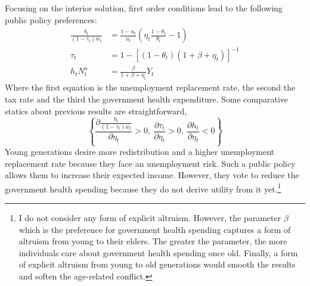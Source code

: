 Focusing on the interior solution, first order conditions lead to the following public policy preferences:
	\begin{align}
		\frac{b_t}{(1-\tau_t)w_t} &= \frac{1-u_t}{u_t} \left(\eta_t\frac{1-\theta_t}{\theta_t}- 1\right)
		\label{eq:inverse_replacement_rate}\\
		\tau_t &= 1 - \left[\left(1-\theta_t\right)\left(1+\beta+\eta_t\right)\right]^{-1}
		\label{eq:tax_rate} \\
		h_t N^o_t &= \frac{\beta}{1+\beta+\eta_t}Y_t
		\label{eq:health_expenditure}
	\end{align}
Where the first equation is the unemployment replacement rate, the second the tax rate and the third the government health expenditure. Some comparative statics about previous results are straightforward,
	\begin{equation*}
		\left\lbrace \frac{\partial \frac{b_t}{(1-\tau_t)w_t}}{\partial \eta_t} > 0, ~ \frac{\partial \tau_t}{\partial \eta_t} > 0, ~\frac{\partial h_t}{\partial \eta_t} < 0\right\rbrace
	\end{equation*}
Young generations desire more redistribution and a higher unemployment replacement rate because they face an unemployment risk. Such a public policy allows them to increase their expected income. However, they vote to reduce the government health spending because they do not derive utility from it yet.\footnote{I do not consider any form of explicit altruism. However, the parameter $\beta$ which is the preference for government health spending captures a form of altruism from young to their elders. The greater the parameter, the more individuals care about government health spending once old. Finally, a form of explicit altruism from young to old generations would smooth the results and soften the age-related conflict.}

